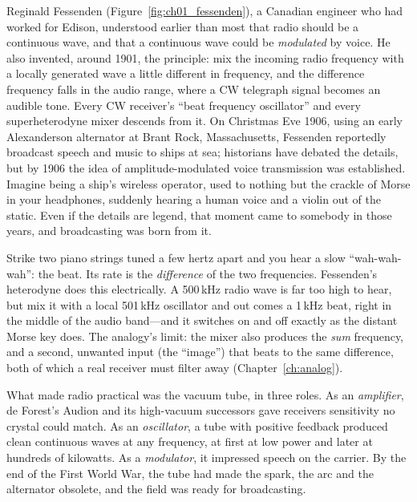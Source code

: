 Reginald Fessenden (Figure~\ref{fig:ch01_fessenden}), a Canadian engineer who had worked for Edison,
understood earlier than most that radio should be a continuous wave, and that a continuous wave could
be \emph{modulated} by voice. He also invented, around 1901, the  principle: mix the
incoming radio frequency with a locally generated wave a little different in frequency, and the
difference frequency falls in the audio range, where a CW telegraph signal becomes an audible tone.
Every CW receiver's ``beat frequency oscillator'' and every superheterodyne mixer descends from it.
On Christmas Eve 1906, using an early Alexanderson alternator at Brant Rock, Massachusetts, Fessenden
reportedly broadcast speech and music to ships at sea; historians have debated the details, but by
1906 the idea of amplitude-modulated voice transmission was established. Imagine being a ship's
wireless operator, used to nothing but the crackle of Morse in your headphones, suddenly hearing a
human voice and a violin out of the static. Even if the details are legend, that moment came to
somebody in those years, and broadcasting was born from it.

\begin{analogy}
Strike two piano strings tuned a few hertz apart and you hear a slow ``wah-wah-wah'': the beat. Its
rate is the \emph{difference} of the two frequencies. Fessenden's heterodyne does this
electrically. A 500\,kHz radio wave is far too high to hear, but mix it with a local 501\,kHz
oscillator and out comes a 1\,kHz beat, right in the middle of the audio band---and it switches on
and off exactly as the distant Morse key does. The analogy's limit: the mixer also produces the
\emph{sum} frequency, and a second, unwanted input (the ``image'') that beats to the same difference,
both of which a real receiver must filter away (Chapter~\ref{ch:analog}).
\end{analogy}

What made radio practical was the vacuum tube, in three roles. As an \emph{amplifier}, de Forest's
Audion and its high-vacuum successors gave receivers sensitivity no crystal could match. As an
\emph{oscillator}, a tube with positive feedback produced clean continuous waves at any frequency, at
first at low power and later at hundreds of kilowatts. As a \emph{modulator}, it impressed speech on
the carrier. By the end of the First World War, the tube had made the spark, the arc and the
alternator obsolete, and the field was ready for broadcasting.


